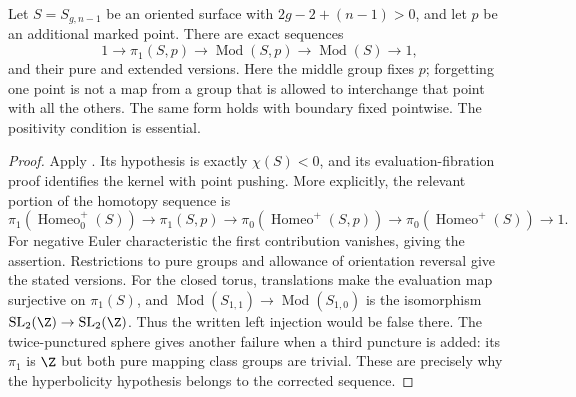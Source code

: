 \begin{proposition}\label{A6-birman}
Let $S=S_{g,n-1}$ be an oriented surface with $2g-2+(n-1)>0$, and let $p$ be an additional marked point. There are exact sequences
\[
 1\longrightarrow\pi_1(S,p)\longrightarrow
 \operatorname{Mod}(S,p)\longrightarrow\operatorname{Mod}(S)
 \longrightarrow1,
\]
and their pure and extended versions. Here the middle group fixes $p$; forgetting one point is not a map from a group that is allowed to interchange that point with all the others. The same form holds with boundary fixed pointwise. The positivity condition is essential.
\end{proposition}
\begin{proof}
Apply \cite[Theorem 4.6 and the remarks immediately following it]{FarbMargalit2012A567}. Its hypothesis is exactly $\chi(S)<0$, and its evaluation-fibration proof identifies the kernel with point pushing. More explicitly, the relevant portion of the homotopy sequence is
\[
 \pi_1(\operatorname{Homeo}_0^+(S))\longrightarrow
 \pi_1(S,p)\longrightarrow
 \pi_0(\operatorname{Homeo}^+(S,p))
 \longrightarrow \pi_0(\operatorname{Homeo}^+(S))
 \longrightarrow1.
\]
For negative Euler characteristic the first contribution vanishes, giving the assertion. Restrictions to pure groups and allowance of orientation reversal give the stated versions.
For the closed torus, translations make the evaluation map surjective on $\pi_1(S)$, and $\operatorname{Mod}(S_{1,1})\to\operatorname{Mod}(S_{1,0})$ is the isomorphism $\operatorname{SL}_2(\Z)\to\operatorname{SL}_2(\Z)$. Thus the written left injection would be false there. The twice-punctured sphere gives another failure when a third puncture is added: its $\pi_1$ is $\Z$ but both pure mapping class groups are trivial. These are precisely why the hyperbolicity hypothesis belongs to the corrected sequence.
\end{proof}

